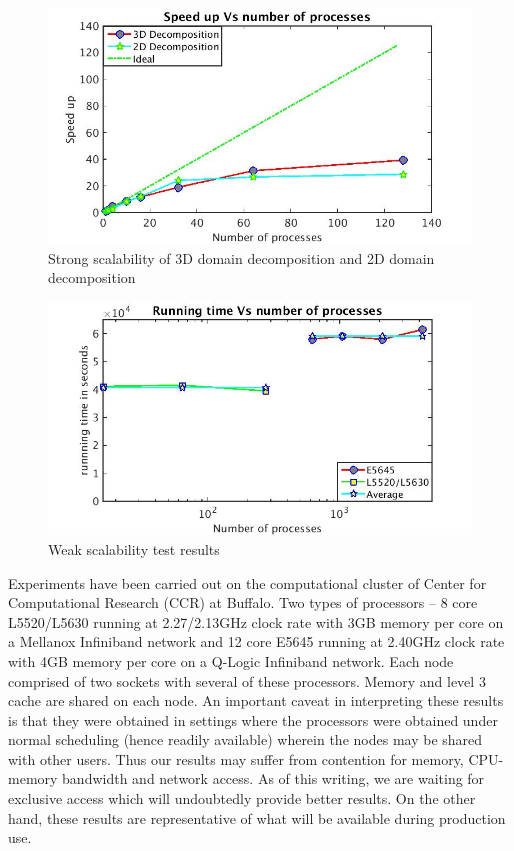 \documentclass[conference,compsoc]{IEEEtran}
\begin{document}
%
\begin{figure}[!t]
\centering
\includegraphics[scale=0.33]{2D_vs_3D_efficiency}
\caption{Strong scalability of 3D domain decomposition and 2D domain decomposition}
\label{fig:2D_vs_3D_efficiency}
\end{figure}
%
\begin{figure}[!t]
\centering
\includegraphics[scale=0.35]{weak_loglog}
\caption{Weak scalability test results}
\label{fig:weak_loglog}
\end{figure}
Experiments have been carried out on the computational cluster of Center for Computational Research (CCR) at Buffalo. Two types of processors -- 8 core L5520/L5630 running at 2.27/2.13GHz clock rate with 3GB memory per core on a Mellanox Infiniband network and 12 core E5645 running at 2.40GHz clock rate with 4GB memory per core on a Q-Logic Infiniband network. Each node comprised of two sockets with several of these processors. Memory and level 3 cache are shared on each node.
An important caveat in interpreting these results is that they were obtained in settings where the processors were obtained under normal scheduling (hence readily available) wherein the nodes may be shared with other users. Thus our results may suffer from contention for memory, CPU-memory bandwidth and network access. As of this writing, we are waiting for exclusive access which will undoubtedly provide better results. On the other hand, these results are representative of what will be available during production use.
\end{document}

